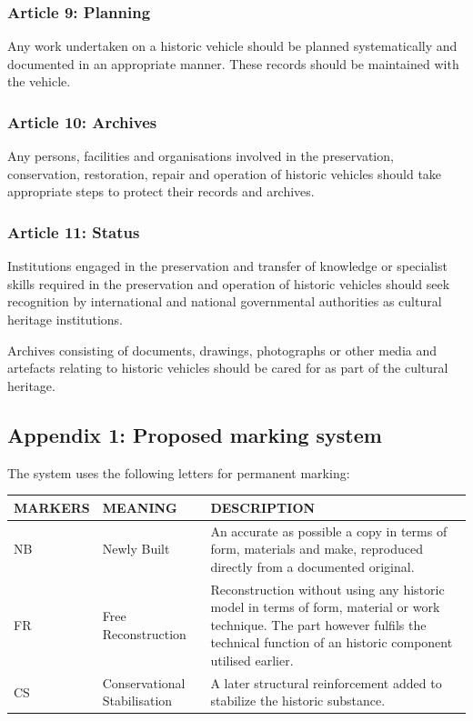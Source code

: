 \documentclass[12pt]{article}
\begin{document}
\subsubsection{Article 9: Planning}

Any work undertaken on a historic vehicle should be planned systematically and documented in an appropriate manner. These records should be maintained with the vehicle. 


\subsubsection{Article 10: Archives}

Any persons, facilities and organisations involved in the preservation, conservation, restoration, repair and operation of historic vehicles should take appropriate steps to protect their records and archives.


\subsubsection{Article 11: Status}

Institutions engaged in the preservation and transfer of knowledge or specialist skills required in the preservation and operation of historic vehicles should seek recognition by international and national governmental authorities as cultural heritage institutions.

Archives consisting of documents, drawings, photographs or other media and artefacts relating to historic vehicles should be cared for as part of the cultural heritage. 


\subsection*{Appendix 1: Proposed marking system}

The system uses the following letters for permanent marking:

\begin{table}[H]
    \begin{tabular}{|l|l|p{7.2cm}|}
    \hline
    MARKERS & MEANING                      & DESCRIPTION\\
    \hline
    NB      & Newly Built                  & An accurate as possible a copy in terms of form, materials and make, reproduced directly from a documented original.\\ 
    \hline
    FR      & Free Reconstruction          & Reconstruction without using any historic model in terms of form, material or work technique. The part however fulfils the technical function of an historic component utilised earlier.\\
    \hline
    CS      & Conservational Stabilisation & A later structural reinforcement added to stabilize the historic substance.\\ \hline
    \end{tabular}
\end{table}
\end{document}
